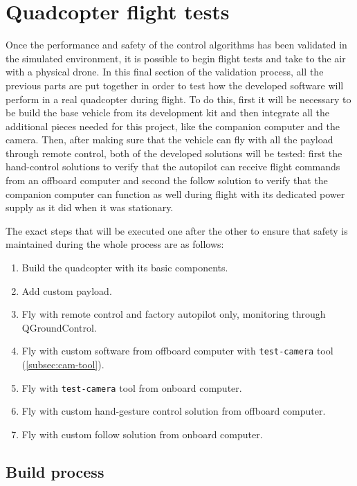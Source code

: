 \section{Quadcopter flight tests}

Once the performance and safety of the control algorithms has been validated in the simulated environment, it is possible to begin flight tests and take to the air with a physical drone.
In this final section of the validation process, all the previous parts are put together in order to test how the developed software will perform in a real quadcopter during flight.
To do this, first it will be necessary to be build the base vehicle from its development kit and then integrate all the additional pieces needed for this project, like the companion computer and the camera.
Then, after making sure that the vehicle can fly with all the payload through remote control, both of the developed solutions will be tested:
first the hand-control solutions to verify that the autopilot can receive flight commands from an offboard computer and second the follow solution to verify that the companion computer can function as well during flight with its dedicated power supply as it did when it was stationary.

The exact steps that will be executed one after the other to ensure that safety is maintained during the whole process are as follows:

\begin{enumerate}
    \item Build the quadcopter with its basic components.
    \item Add custom payload.
    \item Fly with remote control and factory autopilot only, monitoring through QGroundControl.
    \item Fly with custom software from offboard computer with \texttt{test-camera} tool (\ref{subsec:cam-tool}).
    \item Fly with \texttt{test-camera} tool from onboard computer.
    \item Fly with custom hand-gesture control solution from offboard computer.
    \item Fly with custom follow solution from onboard computer.
\end{enumerate}

\subsection{Build process}
\label{sec:test-7-builddrone}

